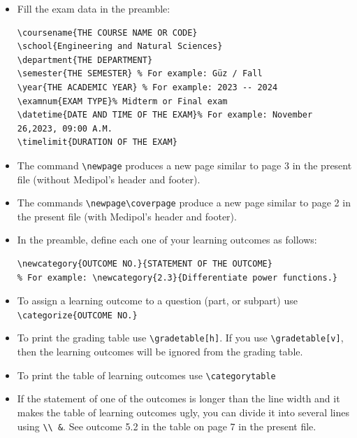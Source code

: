 \documentclass[11pt, addpoints]{exam}
\begin{document}
\coverpage%

\begin{itemize}
\item  Fill the exam data in the preamble:
\begin{verbatim}
\coursename{THE COURSE NAME OR CODE}
\school{Engineering and Natural Sciences}
\department{THE DEPARTMENT}
\semester{THE SEMESTER} % For example: Güz / Fall
\year{THE ACADEMIC YEAR} % For example: 2023 -- 2024
\examnum{EXAM TYPE}% Midterm or Final exam
\datetime{DATE AND TIME OF THE EXAM}% For example: November 26,2023, 09:00 A.M.
\timelimit{DURATION OF THE EXAM}
\end{verbatim}
\item The command \verb|\newpage| produces a new page similar to page 3 in the present file (without Medipol's header and footer).
\item The commands \verb|\newpage\coverpage| produce a new page similar to page 2 in the present file (with Medipol's header and footer).
\item In the preamble, define each one of your learning outcomes as follows:
\begin{verbatim}
\newcategory{OUTCOME NO.}{STATEMENT OF THE OUTCOME} 
% For example: \newcategory{2.3}{Differentiate power functions.} 
\end{verbatim}
\item To assign a learning outcome to a question (part, or subpart) use \verb|\categorize{OUTCOME NO.}|
\item To print the grading table use \verb|\gradetable[h]|. If you use \verb|\gradetable[v]|, then the learning outcomes will be ignored from the grading table.
\item To print the table of learning outcomes use \verb|\categorytable|
\item If the statement of one of the outcomes is longer than the line width and it makes the table of learning outcomes ugly, you can divide it into several lines using \verb|\\ &|. See outcome 5.2 in the table on page 7 in the present file.
\end{itemize}


\newpage
\coverpage

\begin{center}
{\Large{\color{red}{Ex: Cover page with Medipol's header and footer.}}}\\
\end{center}
\end{document}

